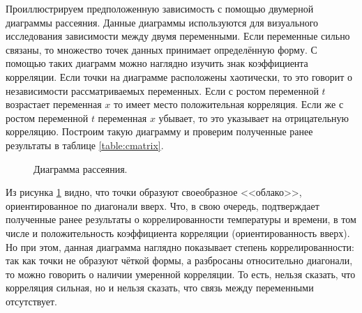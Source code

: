Проиллюстрируем предположенную зависимость с помощью двумерной диаграммы рассеяния. Данные диаграммы используются для визуального исследования зависимости между двумя переменными. Если переменные сильно связаны, то множество точек данных принимает определённую форму. С помощью таких диаграмм можно наглядно изучить знак коэффициента корреляции. Если точки на диаграмме расположены хаотически, то это говорит о независимости рассматриваемых переменных. Если с ростом переменной $t$ возрастает переменная $x$ то имеет место положительная корреляция. Если же с ростом переменной $t$ переменная $x$ убывает, то это указывает на отрицательную корреляцию. Построим такую диаграмму и проверим полученные ранее результаты в таблице \ref{table:cmatrix}.
\begin{figure}[ht]
\caption{Диаграмма рассеяния.}
\label{img:scatterplot}
\end{figure}

Из рисунка \ref{img:scatterplot} видно, что точки образуют своеобразное <<облако>>, ориентированное по диагонали вверх. Что, в свою очередь, подтверждает полученные ранее результаты о коррелированности температуры и времени, в том числе и положительность коэффициента корреляции (ориентированность вверх). Но при этом, данная диаграмма наглядно показывает степень коррелированности: так как точки не образуют чёткой формы, а разбросаны относительно диагонали, то можно говорить о наличии умеренной корреляции. То есть, нельзя сказать, что корреляция сильная, но и нельзя сказать, что связь между переменными отсутствует.


